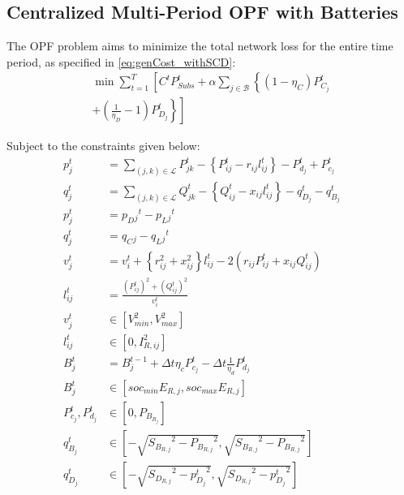 \documentclass[../../outputs/main.tex]{subfiles}
\begin{document}
\subsection{Centralized Multi-Period OPF with Batteries}
The OPF problem aims to minimize the total network loss for the entire time period, as specified in \cref{eq:genCost_withSCD}:
\begin{equation}
    \begin{split}
        \min \sum_{t = 1}^{T} \left[ C^t P^t_{Subs} + \alpha \sum_{j \in \mathcal{B}} \left\{ (1-\eta_C)P^t_{C_j} \right. \right. \\
        \left. \left. + \left( \frac{1}{\eta_D} - 1 \right) P^t_{D_j} \right\} \right]
    \end{split}
    \label{eq:genCost_withSCD}
\end{equation}


Subject to the constraints  given below:
\begin{align}
    {p_j^t} & = {\sum_{(j, k) \in \mathcal{L}} P_{jk}^t - \left\{P_{ij}^t - r_{ij}l_{ij}^t\right\} - P_{d_j}^t + P_{c_j}^t} && \label{eq:Pij} \\ 
    {q_j^t} & = {\sum_{(j, k) \in \mathcal{L}} Q_{jk}^t - \left\{Q_{ij}^t - x_{ij}l_{ij}^t\right\} - q_{D_j}^t - q_{B_j}^t} && \label{eq:Qij} \\ 
    {p_j^t} &= {p_D{_j}^t - p_L{_j}^t} \label{eq:pj}\\
    {q_j^t} &= {q_C{_j} -q_L{_j}^t} \label{eq:qj}\\
    {v_j^t} & = {v_{i}^t +  \left\{r_{ij}^2 + x_{ij}^2\right\}l_{ij}^t - 2(r_{ij}P_{ij}^t + x_{ij}Q_{ij}^t)} \label{eq:vj} && \\
    {l_{ij}^t} & = {\frac{(P_{ij}^{t})^2 + (Q_{ij}^{t})^2}{v_i^t}} \label{eq:lij} && \\
    { v^{t}_{j} } &\in { \left[ V^{2}_{min}, V^{2}_{max} \right]} \label{eq:lim_vj} && \\
    { l^{t}_{ij} } &\in { \left[ 0, I^{2}_{R, ij}
    \right] } \label{eq:lim_lij} && \\
    { B_{j}^{t} } &= {  B_{j}^{t-1} + \Delta t  \eta_c P_{c_j}^t - \Delta t\frac{1}{\eta_d} P_{d_j}^t } \label{eq:Bj} &&  \\
    { B^{t}_{j} } &\in { \left[ soc_{min}E_{R, j}, soc_{max}E_{R, j} \right] } \label{eq:lim_Bj} && \\
    { P^{t}_{c_{j}}, P^{t}_{d_{j}} }
    &\in
    { \left[ 0, P_{B_{R_{j}}} \right]} \label{eq:lim_PcPdj} && \\
    { q^{t}_{B_{j}} } 
    &\in 
    { \left[-\sqrt{ {S_{B_{R, j}}}^2 - {P_{B_{R, j}}}^2}, \sqrt{ {S_{B_{R, j}}}^2 - {P_{B_{R, j}}}^2}\right] } \label{eq:qBj} && \\
    { q^{t}_{D_{j}} } 
    &\in
    { \left[-\sqrt{ {S_{D_{R, j}}}^2 - {p^{t}_{D_{j}}}^2}, \sqrt{ {S_{D_{R, j}}}^2 - {p^{t}_{D_{j}}}^2}\right] } \label{eq:qDj} &&
\end{align}
\end{document}
